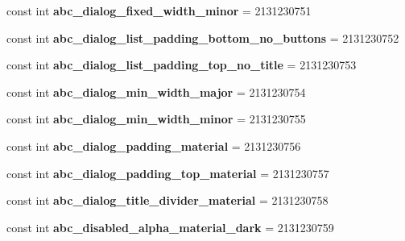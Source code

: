 \begin{DoxyCompactItemize}
const int {\bfseries abc\+\_\+dialog\+\_\+fixed\+\_\+width\+\_\+minor} = 2131230751
\item 
\mbox{\label{classst_delivery_1_1_resource_1_1_dimension_a4dc1e769a8f6191e367c39d6b9d63984}} 
const int {\bfseries abc\+\_\+dialog\+\_\+list\+\_\+padding\+\_\+bottom\+\_\+no\+\_\+buttons} = 2131230752
\item 
\mbox{\label{classst_delivery_1_1_resource_1_1_dimension_abec3f1a41ca46caa45358dc5ae271295}} 
const int {\bfseries abc\+\_\+dialog\+\_\+list\+\_\+padding\+\_\+top\+\_\+no\+\_\+title} = 2131230753
\item 
\mbox{\label{classst_delivery_1_1_resource_1_1_dimension_a6b9ae1ba4c527f179a7047afe060ba1e}} 
const int {\bfseries abc\+\_\+dialog\+\_\+min\+\_\+width\+\_\+major} = 2131230754
\item 
\mbox{\label{classst_delivery_1_1_resource_1_1_dimension_ae266ec5db6b04b55d1c6c36c87d64f47}} 
const int {\bfseries abc\+\_\+dialog\+\_\+min\+\_\+width\+\_\+minor} = 2131230755
\item 
\mbox{\label{classst_delivery_1_1_resource_1_1_dimension_ad69affed6a9d7d17b761722a2f2e8450}} 
const int {\bfseries abc\+\_\+dialog\+\_\+padding\+\_\+material} = 2131230756
\item 
\mbox{\label{classst_delivery_1_1_resource_1_1_dimension_a645acfa91d8f4778e5ec9dc5a3023b46}} 
const int {\bfseries abc\+\_\+dialog\+\_\+padding\+\_\+top\+\_\+material} = 2131230757
\item 
\mbox{\label{classst_delivery_1_1_resource_1_1_dimension_a40421438f020995bb9ce3fb586dd1d45}} 
const int {\bfseries abc\+\_\+dialog\+\_\+title\+\_\+divider\+\_\+material} = 2131230758
\item 
\mbox{\label{classst_delivery_1_1_resource_1_1_dimension_a42e0664e6b99e2da0cde289d0c77549e}} 
const int {\bfseries abc\+\_\+disabled\+\_\+alpha\+\_\+material\+\_\+dark} = 2131230759

\end{DoxyCompactItemize}
